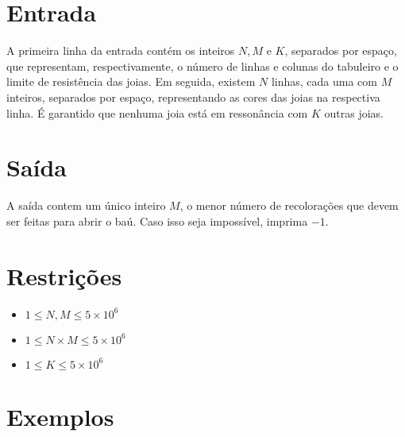 \section*{Entrada}

A primeira linha da entrada contém os inteiros $N, M$ e $K$, separados por espaço, que representam, respectivamente, o número de linhas e colunas do tabuleiro e o limite de resistência das joias.
Em seguida, existem $N$ linhas, cada uma com $M$ inteiros, separados por espaço, representando as cores das joias na respectiva linha.
É garantido que nenhuma joia está em ressonância com $K$ outras joias.

\section*{Saída}

A saída contem um único inteiro $M$, o menor número de recolorações que devem ser feitas para abrir o baú.
Caso isso seja impossível, imprima $-1$.

\section*{Restrições}

\begin{itemize}
\item $1 \leq N, M \leq 5 \times 10^6$
\item $1 \leq N \times M \leq 5 \times 10^6$
\item $1 \leq K \leq 5 \times 10^6$
\end{itemize}


\section*{Exemplos}

\exemplo
